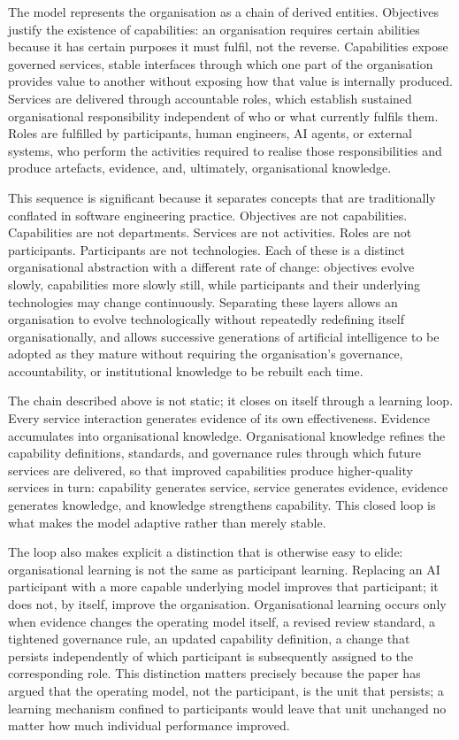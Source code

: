 \documentclass[
  11pt,
]{article}
\begin{document}
The model represents the organisation as a chain of derived entities.
Objectives justify the existence of capabilities: an organisation
requires certain abilities because it has certain purposes it must
fulfil, not the reverse. Capabilities expose governed services, stable
interfaces through which one part of the organisation provides value to
another without exposing how that value is internally produced. Services
are delivered through accountable roles, which establish sustained
organisational responsibility independent of who or what currently
fulfils them. Roles are fulfilled by participants, human engineers, AI
agents, or external systems, who perform the activities required to
realise those responsibilities and produce artefacts, evidence, and,
ultimately, organisational knowledge.

This sequence is significant because it separates concepts that are
traditionally conflated in software engineering practice. Objectives are
not capabilities. Capabilities are not departments. Services are not
activities. Roles are not participants. Participants are not
technologies. Each of these is a distinct organisational abstraction
with a different rate of change: objectives evolve slowly, capabilities
more slowly still, while participants and their underlying technologies
may change continuously. Separating these layers allows an organisation
to evolve technologically without repeatedly redefining itself
organisationally, and allows successive generations of artificial
intelligence to be adopted as they mature without requiring the
organisation's governance, accountability, or institutional knowledge to
be rebuilt each time.

The chain described above is not static; it closes on itself through a
learning loop. Every service interaction generates evidence of its own
effectiveness. Evidence accumulates into organisational knowledge.
Organisational knowledge refines the capability definitions, standards,
and governance rules through which future services are delivered, so
that improved capabilities produce higher-quality services in turn:
capability generates service, service generates evidence, evidence
generates knowledge, and knowledge strengthens capability. This closed
loop is what makes the model adaptive rather than merely stable.

The loop also makes explicit a distinction that is otherwise easy to
elide: organisational learning is not the same as participant learning.
Replacing an AI participant with a more capable underlying model
improves that participant; it does not, by itself, improve the
organisation. Organisational learning occurs only when evidence changes
the operating model itself, a revised review standard, a tightened
governance rule, an updated capability definition, a change that
persists independently of which participant is subsequently assigned to
the corresponding role. This distinction matters precisely because the
paper has argued that the operating model, not the participant, is the
unit that persists; a learning mechanism confined to participants would
leave that unit unchanged no matter how much individual performance
improved.
\end{document}

